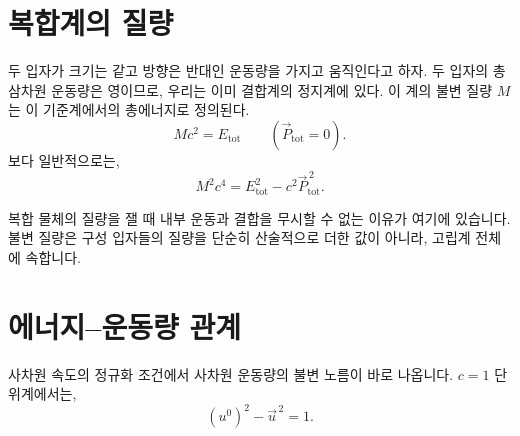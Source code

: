 \section{복합계의 질량}

두 입자가 크기는 같고 방향은 반대인 운동량을 가지고 움직인다고 하자. 두 입자의 총 삼차원 운동량은 영이므로, 우리는 이미 결합계의 정지계에 있다. 이 계의 불변 질량 \(M\)는 이 기준계에서의 총에너지로 정의된다.
\begin{equation}
Mc^2=E_{\mathrm{tot}}
\qquad
(\vec P_{\mathrm{tot}}=0).
\end{equation}
보다 일반적으로는,
\begin{equation}
M^2c^4
=
E_{\mathrm{tot}}^2-c^2\vec P_{\mathrm{tot}}^{\,2}.
\label{eq:sr3-composite-mass}
\end{equation}

\begin{classroomqa}
\end{classroomqa}

복합 물체의 질량을 잴 때 내부 운동과 결합을 무시할 수 없는 이유가 여기에 있습니다. 불변 질량은 구성 입자들의 질량을 단순히 산술적으로 더한 값이 아니라, 고립계 전체에 속합니다.

\begin{classroomqa}
\end{classroomqa}

\section{에너지--운동량 관계}

사차원 속도의 정규화 조건에서 사차원 운동량의 불변 노름이 바로 나옵니다. \(c=1\) 단위계에서는,
\begin{equation}
(u^0)^2-\vec u^{\,2}=1.
\end{equation}

